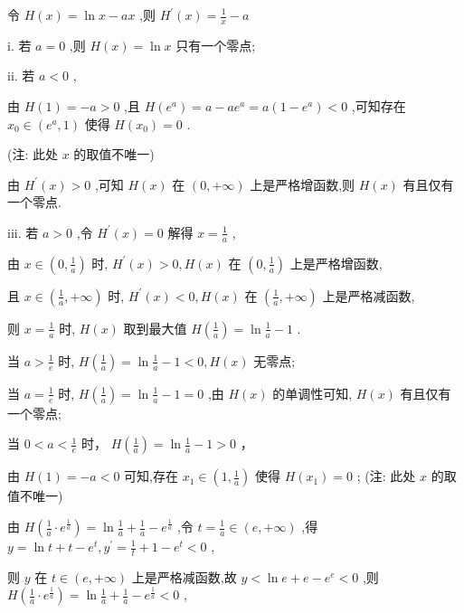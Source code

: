 \documentclass[10pt]{article}
\begin{document}
令 \(H\left( x\right)  = \ln x - {ax}\) ,则 \({H}^{\prime }\left( x\right)  = \frac{1}{x} - a\)

i. 若 \(a = 0\) ,则 \(H\left( x\right)  = \ln x\) 只有一个零点;

ii. 若 \(a < 0\) ,

由 \(H\left( 1\right)  =  - a > 0\) ,且 \(H\left( {e}^{a}\right)  = a - a{e}^{a} = a\left( {1 - {e}^{a}}\right)  < 0\) ,可知存在 \({x}_{0} \in  \left( {{e}^{a},1}\right)\) 使得 \(H\left( {x}_{0}\right)  = 0\) .

(注: 此处 \(x\) 的取值不唯一)

由 \({H}^{\prime }\left( x\right)  > 0\) ,可知 \(H\left( x\right)\) 在 \(\left( {0, + \infty }\right)\) 上是严格增函数,则 \(H\left( x\right)\) 有且仅有一个零点.

iii. 若 \(a > 0\) ,令 \({H}^{\prime }\left( x\right)  = 0\) 解得 \(x = \frac{1}{a}\) ,

由 \(x \in  \left( {0,\frac{1}{a}}\right)\) 时, \({H}^{\prime }\left( x\right)  > 0,H\left( x\right)\) 在 \(\left( {0,\frac{1}{a}}\right)\) 上是严格增函数,

且 \(x \in  \left( {\frac{1}{a}, + \infty }\right)\) 时, \({H}^{\prime }\left( x\right)  < 0,H\left( x\right)\) 在 \(\left( {\frac{1}{a}, + \infty }\right)\) 上是严格减函数,

则 \(x = \frac{1}{a}\) 时, \(H\left( x\right)\) 取到最大值 \(H\left( \frac{1}{a}\right)  = \ln \frac{1}{a} - 1\) .

当 \(a > \frac{1}{e}\) 时, \(H\left( \frac{1}{a}\right)  = \ln \frac{1}{a} - 1 < 0,H\left( x\right)\) 无零点;

当 \(a = \frac{1}{e}\) 时, \(H\left( \frac{1}{a}\right)  = \ln \frac{1}{a} - 1 = 0\) ,由 \(H\left( x\right)\) 的单调性可知, \(H\left( x\right)\) 有且仅有一个零点;

当 \(0 < a < \frac{1}{e}\) 时， \(H\left( \frac{1}{a}\right)  = \ln \frac{1}{a} - 1 > 0\) ，

由 \(H\left( 1\right)  =  - a < 0\) 可知,存在 \({x}_{1} \in  \left( {1,\frac{1}{a}}\right)\) 使得 \(H\left( {x}_{1}\right)  = 0\) ; (注: 此处 \(x\) 的取值不唯一)

由 \(H\left( {\frac{1}{a} \cdot  {e}^{\frac{1}{a}}}\right)  = \ln \frac{1}{a} + \frac{1}{a} - {e}^{\frac{1}{a}}\) ,令 \(t = \frac{1}{a} \in  \left( {e, + \infty }\right)\) ,得 \(y = \ln t + t - {e}^{t},{y}^{\prime } = \frac{1}{t} + 1 - {e}^{t} < 0\) ,

则 \(y\) 在 \(t \in  \left( {e, + \infty }\right)\) 上是严格减函数,故 \(y < \ln e + e - {e}^{e} < 0\) ,则 \(H\left( {\frac{1}{a} \cdot  {e}^{\frac{1}{a}}}\right)  = \ln \frac{1}{a} + \frac{1}{a} - {e}^{\frac{1}{a}} < 0\) ,
\end{document}
